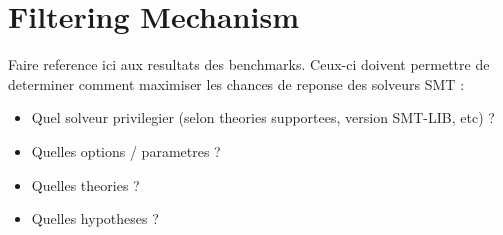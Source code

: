 \section{Filtering Mechanism}
Faire reference ici aux resultats des benchmarks.
Ceux-ci doivent permettre de determiner comment maximiser les chances de reponse des solveurs SMT :
\begin{itemize}
\item Quel solveur privilegier (selon theories supportees, version SMT-LIB, etc) ?
\item Quelles options / parametres ?
\item Quelles theories ?
\item Quelles hypotheses ?
\end{itemize}

\subsection{}

\paragraph{}



